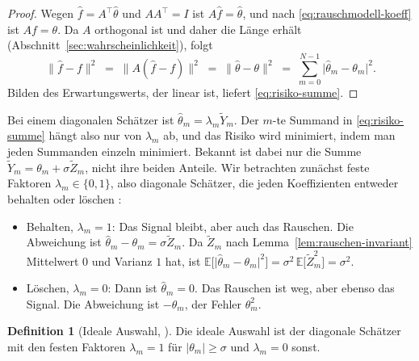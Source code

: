 \documentclass[a4paper,11pt,bibliography=totoc,listof=totoc,headinclude=true,cleardoublepage=empty,oneside]{scrbook}
\theoremstyle{plain}
\theoremstyle{definition}
\newtheorem{Definition}[Satz]{Definition}
\newcommand{\norm}[1]{\lVert #1 \rVert}
\begin{document}
\begin{proof}
Wegen $\hat f = A^\top\hat\theta$ und $AA^\top = I$ ist $A\hat f = \hat\theta$,
und nach \eqref{eq:rauschmodell-koeff} ist $Af = \theta$. Da $A$ orthogonal ist
und daher die Länge erhält (Abschnitt~\ref{sec:wahrscheinlichkeit}), folgt
\[
  \norm{\hat f - f}^2 \;=\; \norm{A(\hat f - f)}^2 \;=\; \norm{\hat\theta - \theta}^2
  \;=\; \sum_{m=0}^{N-1}\lvert\hat\theta_m - \theta_m\rvert^2 .
\]
Bilden des Erwartungswerts, der linear ist, liefert \eqref{eq:risiko-summe}.
\end{proof}
 
Bei einem diagonalen Schätzer ist $\hat\theta_m = \lambda_m\tilde Y_m$. Der
$m$-te Summand in \eqref{eq:risiko-summe} hängt also nur von $\lambda_m$ ab, und
das Risiko wird minimiert, indem man jeden Summanden einzeln minimiert. Bekannt
ist dabei nur die Summe $\tilde Y_m = \theta_m + \sigma\tilde Z_m$, nicht ihre
beiden Anteile. Wir betrachten zunächst feste Faktoren $\lambda_m \in \{0,1\}$,
also diagonale Schätzer, die jeden Koeffizienten entweder behalten oder
löschen \cite[Kap.~11.2.1]{mallat}: %
 
\begin{itemize}
\item Behalten, $\lambda_m = 1$: Das Signal bleibt, aber auch das Rauschen. Die
  Abweichung ist $\hat\theta_m - \theta_m = \sigma\tilde Z_m$. Da $\tilde Z_m$
  nach Lemma~\ref{lem:rauschen-invariant} Mittelwert $0$ und Varianz $1$ hat,
  ist $\mathbb E\bigl[\lvert\hat\theta_m - \theta_m\rvert^2\bigr]
  = \sigma^2\,\mathbb E\bigl[\tilde Z_m^2\bigr] = \sigma^2$.
\item Löschen, $\lambda_m = 0$: Dann ist $\hat\theta_m = 0$. Das Rauschen ist
  weg, aber ebenso das Signal. Die Abweichung ist $-\theta_m$, der Fehler
  $\theta_m^2$.
\end{itemize}
 
 
\begin{Definition}[Ideale Auswahl, {\cite[Gl.~(11.32)--(11.34)]{mallat}}] %
\label{def:ideale-auswahl}
Die ideale Auswahl ist der diagonale Schätzer mit den festen Faktoren
$\lambda_m = 1$ für $\lvert\theta_m\rvert \ge \sigma$ und $\lambda_m = 0$ sonst.
\end{Definition}
 
\end{document}
